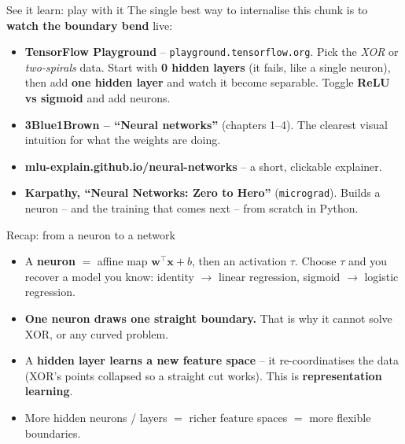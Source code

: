 \documentclass[aspectratio=43]{beamer}
\begin{document}
\begin{frame}{See it learn: play with it}
  The single best way to internalise this chunk is to \textbf{watch the boundary bend} live:
  \vfill
  \begin{itemize}\small
    \item \textbf{TensorFlow Playground} -- \texttt{playground.tensorflow.org}. Pick the
      \emph{XOR} or \emph{two-spirals} data. Start with \textbf{0 hidden layers} (it fails,
      like a single neuron), then add \textbf{one hidden layer} and watch it become separable.
      Toggle \textbf{ReLU vs sigmoid} and add neurons.
    \item \textbf{3Blue1Brown -- ``Neural networks''} (chapters 1--4). The clearest visual
      intuition for what the weights are doing.
    \item \textbf{mlu-explain.github.io/neural-networks} -- a short, clickable explainer.
    \item \textbf{Karpathy, ``Neural Networks: Zero to Hero''} (\texttt{micrograd}). Builds a
      neuron -- and the training that comes next -- from scratch in Python.
  \end{itemize}
  \vfill
\end{frame}

\begin{frame}{Recap: from a neuron to a network}
  \begin{itemize}\small
    \item A \textbf{neuron} $=$ affine map $\mathbf{w}^\top\mathbf{x}+b$, then an activation
      $\tau$. Choose $\tau$ and you recover a model you know: identity $\to$ linear regression,
      sigmoid $\to$ logistic regression.
    \item \textbf{One neuron draws one straight boundary.} That is why it cannot solve XOR, or
      any curved problem.
    \item A \textbf{hidden layer learns a new feature space} -- it re-coordinatises the data
      (XOR's points collapsed so a straight cut works). This is \textbf{representation
      learning}.
    \item More hidden neurons / layers $=$ richer feature spaces $=$ more flexible boundaries.
  \end{itemize}
  \vfill
\end{frame}
\end{document}
